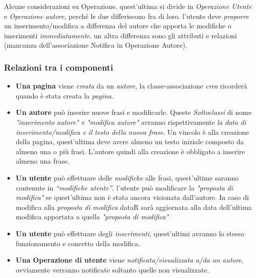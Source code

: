         Alcune considerazioni su Operazione. quest'ultima si divide in \textit{Operazione Utente} e\textit{ Operazione autore}, perché le due differiscono fra di loro. l'utente deve \textit{proporre} un inserimento/modifica a differenza del autore che apporta le modifiche o inserimenti \textit{immediatamente}. un altra differenza sono gli attributi e relazioni (mancanza dell'associazione Notifica in Operazione Autore).
        
\subsubsection{Relazioni tra i componenti}
        \begin{itemize}
            \item{\textbf{Una pagina} viene \textit{creata} da un \textit{autore}, la classe-associazione \textit{crea} ricorderà quando è stata creata la \textit{pagina}.}\newline
            \item{\textbf{Un autore} può inserire nuove frasi e modificarle. Queste \textit{Sottoclassi} di nome \textit{"inserimento autore" e "modifica autore"} avranno rispettivamente \textit{la data di inserimento/modifica e il testo della nuova frase}. Un vincolo è alla creazione della pagina, quest’ultima deve avere almeno un testo iniziale composto da almeno una o più frasi. L’autore quindi alla creazione è obbligato a inserire almeno una frase.}\newline
            
            \item{\textbf{Un utente} può effettuare delle \textit{modifiche} alle frasi, quest'ultime saranno contenute in \textit{“modifiche utente”}. l'utente può modificare la \textit{"proposta di modifica"} se quest'ultima non è stata ancora visionata dall'autore. In caso di modifica alla \textit{proposta di modifica} dataR sarà aggiornata alla data dell'ultima modifica apportata a quella \textit{"proposta di modifica"}\newline
            }
            
            \item{\textbf{Un utente} può effettuare degli \textit{inserimenti}, quest'ultimi avranno lo stesso funzionamento e concetto della modifica.}\newline
            
            \item{\textbf{Una Operazione di utente} viene \textit{notificata/visualizzata a/da un autore}, ovviamente verranno  notificate soltanto quelle non visualizzate.}\newline
        \end{itemize}

